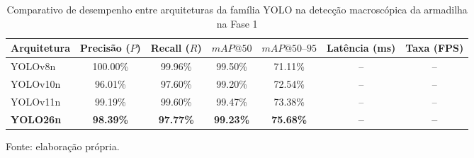 \begin{table}[H]
    \centering
    \small
    \setlength{\tabcolsep}{5pt}
    \captionsetup{justification=centering}
    \caption{Comparativo de desempenho entre arquiteturas da família YOLO na detecção macroscópica da armadilha na Fase 1}
    \label{tab:comparativo_yolo_fase1_resultados}
    \vspace{0.2cm}
    \begin{tabular}{lcccccc}
        \hline
        \textbf{Arquitetura} & \textbf{Precisão ($P$)} & \textbf{Recall ($R$)} & \textbf{$mAP@50$} & \textbf{$mAP@50\text{--}95$} & \textbf{Latência (ms)} & \textbf{Taxa (FPS)} \\
        \hline
        YOLOv8n    & 100.00\%     & 99.96\%    & 99.50\%    & 71.11\%         & --           & -- \\
        YOLOv10n   & 96.01\%      & 97.60\%    & 99.20\%    & 72.54\%         & --           & -- \\
        YOLOv11n   & 99.19\%      & 99.60\%    & 99.47\%    & 73.38\%         & --           & -- \\
        \textbf{YOLO26n} & \textbf{98.39\%} & \textbf{97.77\%} & \textbf{99.23\%} & \textbf{75.68\%} & \textbf{--} & \textbf{--} \\
        \hline
    \end{tabular}
    \vspace{0.2cm}
    \begin{flushleft}
        \footnotesize Fonte: elaboração própria.
    \end{flushleft}
\end{table}


